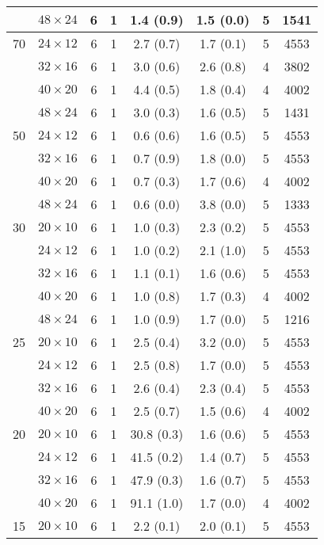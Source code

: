 \begin{longtable}{cccccccc}
    & $48 \times  24$ &  6 & 1 & 1.4 \; (0.9) & 1.5 \; (0.0) & 5 & 1541 \\
\midrule
 70 & $24 \times  12$ &  6 & 1 & 2.7 \; (0.7) & 1.7 \; (0.1) & 5 & 4553 \\
    & $32 \times  16$ &  6 & 1 & 3.0 \; (0.6) & 2.6 \; (0.8) & 4 & 3802 \\
    & $40 \times  20$ &  6 & 1 & 4.4 \; (0.5) & 1.8 \; (0.4) & 4 & 4002 \\
    & $48 \times  24$ &  6 & 1 & 3.0 \; (0.3) & 1.6 \; (0.5) & 5 & 1431 \\
\midrule
 50 & $24 \times  12$ &  6 & 1 & 0.6 \; (0.6) & 1.6 \; (0.5) & 5 & 4553 \\
    & $32 \times  16$ &  6 & 1 & 0.7 \; (0.9) & 1.8 \; (0.0) & 5 & 4553 \\
    & $40 \times  20$ &  6 & 1 & 0.7 \; (0.3) & 1.7 \; (0.6) & 4 & 4002 \\
    & $48 \times  24$ &  6 & 1 & 0.6 \; (0.0) & 3.8 \; (0.0) & 5 & 1333 \\
\midrule
 30 & $20 \times  10$ &  6 & 1 & 1.0 \; (0.3) & 2.3 \; (0.2) & 5 & 4553 \\
    & $24 \times  12$ &  6 & 1 & 1.0 \; (0.2) & 2.1 \; (1.0) & 5 & 4553 \\
    & $32 \times  16$ &  6 & 1 & 1.1 \; (0.1) & 1.6 \; (0.6) & 5 & 4553 \\
    & $40 \times  20$ &  6 & 1 & 1.0 \; (0.8) & 1.7 \; (0.3) & 4 & 4002 \\
    & $48 \times  24$ &  6 & 1 & 1.0 \; (0.9) & 1.7 \; (0.0) & 5 & 1216 \\
\midrule
 25 & $20 \times  10$ &  6 & 1 & 2.5 \; (0.4) & 3.2 \; (0.0) & 5 & 4553 \\
    & $24 \times  12$ &  6 & 1 & 2.5 \; (0.8) & 1.7 \; (0.0) & 5 & 4553 \\
    & $32 \times  16$ &  6 & 1 & 2.6 \; (0.4) & 2.3 \; (0.4) & 5 & 4553 \\
    & $40 \times  20$ &  6 & 1 & 2.5 \; (0.7) & 1.5 \; (0.6) & 4 & 4002 \\
\midrule
 20 & $20 \times  10$ &  6 & 1 & 30.8 \; (0.3) & 1.6 \; (0.6) & 5 & 4553 \\
    & $24 \times  12$ &  6 & 1 & 41.5 \; (0.2) & 1.4 \; (0.7) & 5 & 4553 \\
    & $32 \times  16$ &  6 & 1 & 47.9 \; (0.3) & 1.6 \; (0.7) & 5 & 4553 \\
    & $40 \times  20$ &  6 & 1 & 91.1 \; (1.0) & 1.7 \; (0.0) & 4 & 4002 \\
\midrule
 15 & $20 \times  10$ &  6 & 1 & 2.2 \; (0.1) & 2.0 \; (0.1) & 5 & 4553 \\

\end{longtable}

